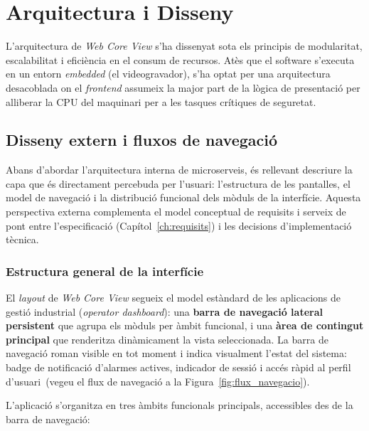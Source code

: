 \chapter{Arquitectura i Disseny}
\label{ch:arquitectura}

L'arquitectura de \textit{Web Core View} s'ha dissenyat sota els principis de modularitat, escalabilitat i eficiència en el consum de recursos. Atès que el software s'executa en un entorn \textit{embedded} (el videogravador), s'ha optat per una arquitectura desacoblada on el \textit{frontend} assumeix la major part de la lògica de presentació per alliberar la CPU del maquinari per a les tasques crítiques de seguretat.

\section{Disseny extern i fluxos de navegació}
\label{sec:disseny_extern}

Abans d'abordar l'arquitectura interna de microserveis, és rellevant descriure la capa que és directament percebuda per l'usuari: l'estructura de les pantalles, el model de navegació i la distribució funcional dels mòduls de la interfície. Aquesta perspectiva externa complementa el model conceptual de requisits i serveix de pont entre l'especificació (Capítol~\ref{ch:requisits}) i les decisions d'implementació tècnica.

\subsection{Estructura general de la interfície }

El \textit{layout} de \textit{Web Core View} segueix el model estàndard de les aplicacions de gestió industrial (\textit{operator dashboard}): una \textbf{barra de navegació lateral persistent} que agrupa els mòduls per àmbit funcional, i una \textbf{àrea de contingut principal} que renderitza dinàmicament la vista seleccionada. La barra de navegació roman visible en tot moment i indica visualment l'estat del sistema: badge de notificació d'alarmes actives, indicador de sessió i accés ràpid al perfil d'usuari~(vegeu el flux de navegació a la Figura~\ref{fig:flux_navegacio}).

L'aplicació s'organitza en tres àmbits funcionals principals, accessibles des de la barra de navegació:

